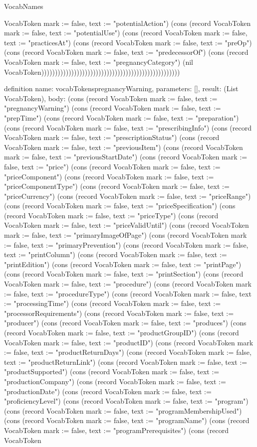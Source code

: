 \begin{lexlean}{VocabNames}
\begin{semanticmodule}
{VocabToken {mark := false, text := "potentialAction"}) (cons (record VocabToken {mark := false, text := "potentialUse"}) (cons (record VocabToken {mark := false, text := "practicesAt"}) (cons (record VocabToken {mark := false, text := "preOp"}) (cons (record VocabToken {mark := false, text := "predecessorOf"}) (cons (record VocabToken {mark := false, text := "pregnancyCategory"}) (nil VocabToken)))))))))))))))))))))))))))))))))))))))))))))))))))
}

definition{
  name: vocabTokenspregnancyWarning,
  parameters: [],
  result: (List VocabToken),
  body: (cons (record VocabToken {mark := false, text := "pregnancyWarning"}) (cons (record VocabToken {mark := false, text := "prepTime"}) (cons (record VocabToken {mark := false, text := "preparation"}) (cons (record VocabToken {mark := false, text := "prescribingInfo"}) (cons (record VocabToken {mark := false, text := "prescriptionStatus"}) (cons (record VocabToken {mark := false, text := "previousItem"}) (cons (record VocabToken {mark := false, text := "previousStartDate"}) (cons (record VocabToken {mark := false, text := "price"}) (cons (record VocabToken {mark := false, text := "priceComponent"}) (cons (record VocabToken {mark := false, text := "priceComponentType"}) (cons (record VocabToken {mark := false, text := "priceCurrency"}) (cons (record VocabToken {mark := false, text := "priceRange"}) (cons (record VocabToken {mark := false, text := "priceSpecification"}) (cons (record VocabToken {mark := false, text := "priceType"}) (cons (record VocabToken {mark := false, text := "priceValidUntil"}) (cons (record VocabToken {mark := false, text := "primaryImageOfPage"}) (cons (record VocabToken {mark := false, text := "primaryPrevention"}) (cons (record VocabToken {mark := false, text := "printColumn"}) (cons (record VocabToken {mark := false, text := "printEdition"}) (cons (record VocabToken {mark := false, text := "printPage"}) (cons (record VocabToken {mark := false, text := "printSection"}) (cons (record VocabToken {mark := false, text := "procedure"}) (cons (record VocabToken {mark := false, text := "procedureType"}) (cons (record VocabToken {mark := false, text := "processingTime"}) (cons (record VocabToken {mark := false, text := "processorRequirements"}) (cons (record VocabToken {mark := false, text := "producer"}) (cons (record VocabToken {mark := false, text := "produces"}) (cons (record VocabToken {mark := false, text := "productGroupID"}) (cons (record VocabToken {mark := false, text := "productID"}) (cons (record VocabToken {mark := false, text := "productReturnDays"}) (cons (record VocabToken {mark := false, text := "productReturnLink"}) (cons (record VocabToken {mark := false, text := "productSupported"}) (cons (record VocabToken {mark := false, text := "productionCompany"}) (cons (record VocabToken {mark := false, text := "productionDate"}) (cons (record VocabToken {mark := false, text := "proficiencyLevel"}) (cons (record VocabToken {mark := false, text := "program"}) (cons (record VocabToken {mark := false, text := "programMembershipUsed"}) (cons (record VocabToken {mark := false, text := "programName"}) (cons (record VocabToken {mark := false, text := "programPrerequisites"}) (cons (record VocabToken }
\end{semanticmodule}
\end{lexlean}
